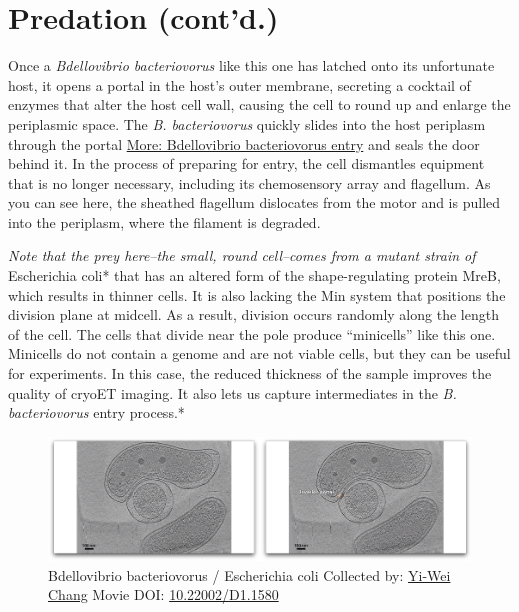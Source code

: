 \documentclass[]{tufte-book}
\begin{document}
\section{Predation (cont'd.)}\label{predation-contd.}

Once a \emph{Bdellovibrio bacteriovorus} like this one has latched onto
its unfortunate host, it opens a portal in the host's outer membrane,
secreting a cocktail of enzymes that alter the host cell wall, causing
the cell to round up and enlarge the periplasmic space. The \emph{B.
bacteriovorus} quickly slides into the host periplasm through the portal
\protect\hyperlink{Bdellovibrio_bacteriovorus_entry}{More: Bdellovibrio
bacteriovorus entry} and seals the door behind it. In the process of
preparing for entry, the cell dismantles equipment that is no longer
necessary, including its chemosensory array and flagellum. As you can
see here, the sheathed flagellum dislocates from the motor and is pulled
into the periplasm, where the filament is degraded.

\emph{Note that the prey here--the small, round cell--comes from a
mutant strain of }Escherichia coli* that has an altered form of the
shape-regulating protein MreB, which results in thinner cells. It is
also lacking the Min system that positions the division plane at
midcell. As a result, division occurs randomly along the length of the
cell. The cells that divide near the pole produce ``minicells'' like
this one. Minicells do not contain a genome and are not viable cells,
but they can be useful for experiments. In this case, the reduced
thickness of the sample improves the quality of cryoET imaging. It also
lets us capture intermediates in the \emph{B. bacteriovorus} entry
process.*





\begin{figure}
\includegraphics{movie_stills/9_10} \caption[Bdellovibrio bacteriovorus / Escherichia coli Collected by:
\protect\hyperlink{yi-wei_chang}{Yi-Wei Chang} Movie DOI:
\href{https://doi.org/10.22002/D1.1580}{10.22002/D1.1580}]{Bdellovibrio bacteriovorus / Escherichia coli Collected by:
\protect\hyperlink{yi-wei_chang}{Yi-Wei Chang} Movie DOI:
\href{https://doi.org/10.22002/D1.1580}{10.22002/D1.1580}}\label{fig:9-10}
\end{figure}
\end{document}
